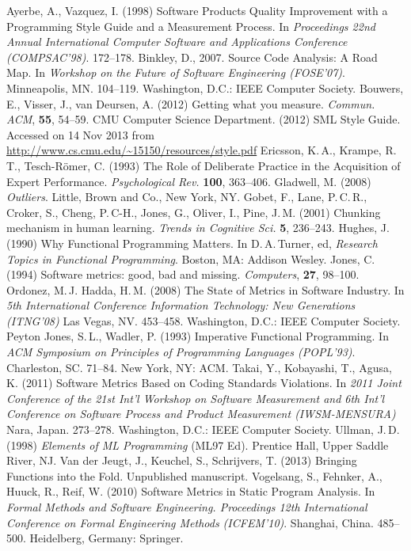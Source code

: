 \documentclass[12pt,abstracton]{scrartcl}
\begin{document}
\begin{thebibliography}{99}
 Ayerbe, A., Vazquez, I. (1998) Software Products Quality Improvement with a Programming Style Guide and a Measurement Process. In \emph{Proceedings 22nd Annual International Computer Software and Applications Conference (COMPSAC'98)}. 172--178.
 Binkley, D., 2007. Source Code Analysis: A Road Map. In \emph{Workshop on the Future of Software Engineering (FOSE'07)}. Minneapolis, MN. 104--119. Washington, D.C.: IEEE Computer Society.
 Bouwers, E., Visser, J., van Deursen, A. (2012) Getting what you measure. \emph{Commun. ACM}, \textbf{55}, 54--59.
 CMU Computer Science Department. (2012) SML Style Guide. Accessed on 14 Nov 2013 from \url{http://www.cs.cmu.edu/~15150/resources/style.pdf}
 Ericsson, K.\,A., Krampe, R.\,T., Tesch-R\"{o}mer, C. (1993) The Role of Deliberate Practice in the Acquisition of Expert Performance. \emph{Psychological Rev.} \textbf{100}, 363--406.
 Gladwell, M. (2008) \emph{Outliers}. Little, Brown and Co., New York, NY.
 Gobet, F., Lane, P.\,C.\,R., Croker, S., Cheng, P.\,C-H., Jones, G., Oliver, I., Pine, J.\,M. (2001) Chunking mechanism in human learning. \emph{Trends in Cognitive Sci.} \textbf{5}, 236--243.
 Hughes, J. (1990) Why Functional Programming Matters. In D.\,A.\,Turner, ed, \emph{Research Topics in Functional Programming}. Boston, MA: Addison Wesley.
 Jones, C. (1994) Software metrics: good, bad and missing. \emph{Computers}, \textbf{27}, 98--100.
 Ordonez, M.\,J. Hadda, H.\,M. (2008) The State of Metrics in Software Industry. In \emph{5th International Conference Information Technology: New Generations (ITNG'08)} Las Vegas, NV. 453--458. Washington, D.C.: IEEE Computer Society.
 Peyton Jones, S.\,L., Wadler, P. (1993) Imperative Functional Programming. In \emph{ACM Symposium on Principles of Programming Languages (POPL'93)}. Charleston, SC. 71--84. New York, NY: ACM.
 Takai, Y., Kobayashi, T., Agusa, K. (2011) Software Metrics Based on Coding Standards Violations. In \emph{2011 Joint Conference of the 21st Int'l Workshop on Software Measurement and 6th Int'l Conference on Software Process and Product Measurement (IWSM-MENSURA)} Nara, Japan. 273--278. Washington, D.C.: IEEE Computer Society.
 Ullman, J.\,D. (1998) \emph{Elements of ML Programming} (ML97 Ed). Prentice Hall, Upper Saddle River, NJ.
 Van der Jeugt, J., Keuchel, S., Schrijvers, T. (2013) Bringing Functions into the Fold. Unpublished manuscript.
 Vogelsang, S., Fehnker, A., Huuck, R., Reif, W. (2010) Software Metrics in Static Program Analysis. In \emph{Formal Methods and Software Engineering. Proceedings 12th International Conference on Formal Engineering Methods (ICFEM'10)}. Shanghai, China. 485--500. Heidelberg, Germany: Springer.
\end{thebibliography}
\end{document}

